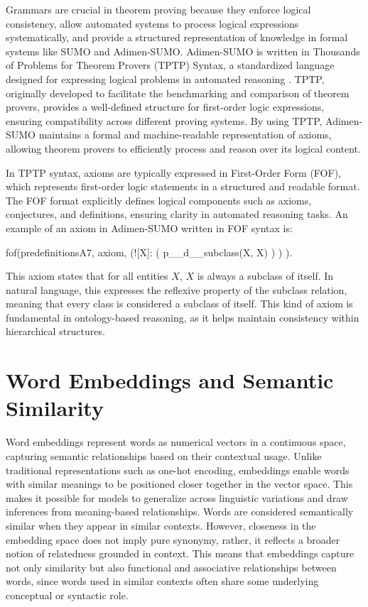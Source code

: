 \documentclass[english,version-2020-11]{uzl-thesis}
\begin{document}
Grammars are crucial in theorem proving because they enforce logical consistency, allow automated systems to process logical expressions systematically, and provide a structured representation of knowledge in formal systems like SUMO and Adimen-SUMO. Adimen-SUMO is written in Thousands of Problems for Theorem Provers (TPTP) Syntax, a standardized language designed for expressing logical problems in automated reasoning \cite{Alvez2014}. TPTP, originally developed to facilitate the benchmarking and comparison of theorem provers, provides a well-defined structure for first-order logic expressions, ensuring compatibility across different proving systems. By using TPTP, Adimen-SUMO maintains a formal and machine-readable representation of axioms, allowing theorem provers to efficiently process and reason over its logical content.

In TPTP syntax, axioms are typically expressed in First-Order Form (FOF), which represents first-order logic statements in a structured and readable format. The FOF format explicitly defines logical components such as axioms, conjectures, and definitions, ensuring clarity in automated reasoning tasks. An example of an axiom in Adimen-SUMO written in FOF syntax is:


\begin{Pseudocode}[morekeywords = {add, create}, deletekeywords={to}, numbers=left,
    caption = {Axiom example Adimen-SUMO}]
    fof(predefinitionsA7, axiom,
        (![X]: 
            (
                p__d__subclass(X, X)
            )
        )
    ).
\end{Pseudocode}

This axiom states that for all entities \( X \), \( X \) is always a subclass of itself. In natural language, this expresses the reflexive property of the subclass relation, meaning that every class is considered a subclass of itself. This kind of axiom is fundamental in ontology-based reasoning, as it helps maintain consistency within hierarchical structures.

\section{Word Embeddings and Semantic Similarity}

Word embeddings represent words as numerical vectors in a continuous space, capturing semantic relationships based on their contextual usage. Unlike traditional representations such as one-hot encoding, embeddings enable words with similar meanings to be positioned closer together in the vector space. This makes it possible for models to generalize across linguistic variations and draw inferences from meaning-based relationships.
Words are considered semantically similar when they appear in similar contexts. However, closeness in the embedding space does not imply pure synonymy, rather, it reflects a broader notion of relatedness grounded in context. This means that embeddings capture not only similarity but also functional and associative relationships between words, since words used in similar contexts often share some underlying conceptual or syntactic role.
\end{document}
